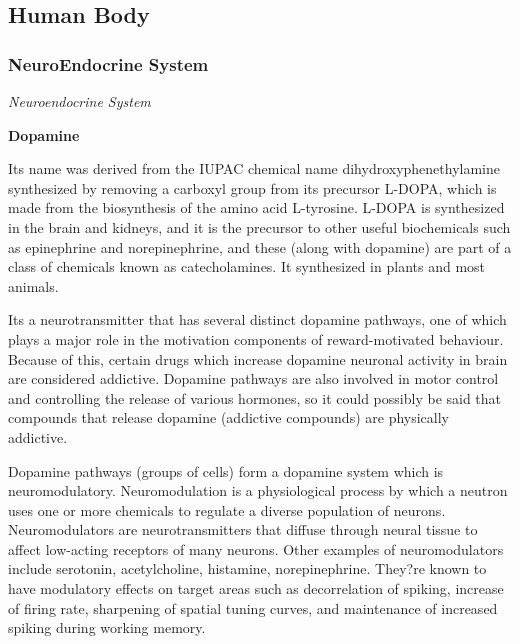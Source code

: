 \documentclass{article}
\newcounter{subsubsubsection}[subsubsection]
\begin{document}

\subsection{Human Body}
\subsubsection{NeuroEndocrine System}

\textit{Neuroendocrine System}

\textbf{Dopamine}

Its name was derived from the IUPAC chemical name dihydroxyphenethylamine synthesized by removing a carboxyl group from its precursor L-DOPA, which is made from the biosynthesis of the amino acid L-tyrosine. L-DOPA is synthesized in the brain and kidneys, and it is the precursor to other useful biochemicals such as epinephrine and norepinephrine, and these (along with dopamine) are part of a class of chemicals known as catecholamines. It synthesized in plants and most animals. 

Its a neurotransmitter that has several distinct dopamine pathways, one of which plays a major role in the motivation components of reward-motivated behaviour. Because of this, certain drugs which increase dopamine neuronal activity in brain are considered addictive. Dopamine pathways are also involved in motor control and controlling the release of various hormones, so it could possibly be said that compounds that release dopamine (addictive compounds) are physically addictive. 

Dopamine pathways (groups of cells) form a dopamine system which is neuromodulatory. Neuromodulation is a physiological process by which a neutron uses one or more chemicals to regulate a diverse population of neurons. Neuromodulators are neurotransmitters that diffuse through neural tissue to affect low-acting receptors of many neurons. Other examples of neuromodulators include serotonin, acetylcholine, histamine, norepinephrine. They?re known to have modulatory effects on target areas such as decorrelation of spiking, increase of firing rate, sharpening of spatial tuning curves, and maintenance of increased spiking during working memory.



\end{document}

